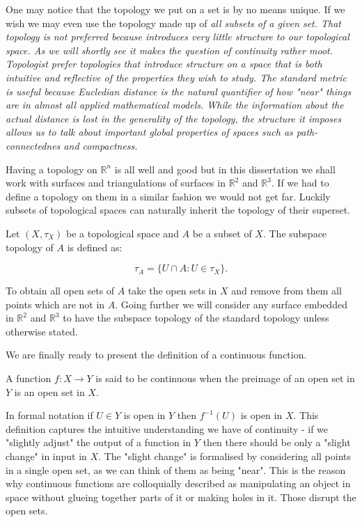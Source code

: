 One may notice that the topology we put on a set is by no means unique. If we wish we may even use the topology made up of \em all \em subsets of a given set. That topology is not preferred because introduces very little structure to our topological space. As we will shortly see it makes the question of continuity rather moot. Topologist prefer topologies that introduce structure on a space that is both intuitive and reflective of the properties they wish to study. The standard metric is useful because Eucledian distance is the natural quantifier of how "near" things are in almost all applied mathematical models. While the information about the actual distance is lost in the generality of the topology, the structure it imposes allows us to talk about important global properties of spaces such as path-connectednes and compactness.

Having a topology on $\mathbb{R}^n$ is all well and good but in this dissertation we shall work with surfaces and triangulations of surfaces in $\mathbb{R}^2$ and $\mathbb{R}^3$. If we had to define a topology on them in a similar fashion we would not get far. Luckily subsets of topological spaces can naturally inherit the topology of their superset.

\begin{defn} Let $(X, \tau_X)$ be a topological space and $A$ be a subset of $X$. The subspace topology of $A$ is defined as: \end{defn}

$$ \tau_A = \{U \cap A: U \in \tau_X\}.$$

To obtain all open sets of $A$ take the open sets in $X$ and remove from them all points which are not in $A$. Going further we will consider any surface embedded in $\mathbb{R}^2$ and $\mathbb{R}^3$ to have the subspace topology of the standard topology unless otherwise stated.

We are finally ready to present the definition of a continuous function. 

\begin{defn} A function $f : X \to Y$ is said to be continuous when the preimage of an open set in $Y$ is an open set in $X$. \end{defn}

In formal notation if $U \in Y$ is open in $Y$ then $f^{-1}(U)$ is open in $X$. This definition captures the intuitive understanding we have of continuity - if we "slightly adjust" the output of a function in $Y$ then there should be only a "slight change" in input in $X$. The "slight change" is formalised by considering all points in a single open set, as we can think of them as being "near". This is the reason why continuous functions are colloquially described as manipulating an object in space without glueing together parts of it or making holes in it. Those disrupt the open sets.

